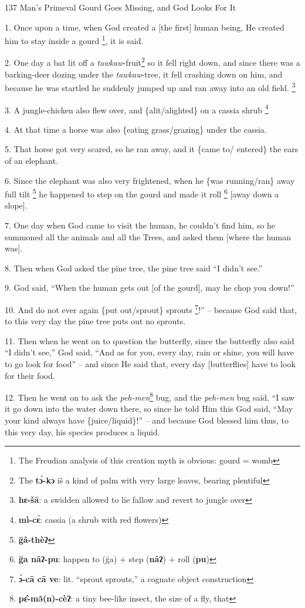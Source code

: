 
137 Man's Primeval Gourd Goes Missing, and God Looks For It

1. Once upon a time, when God created a [the first] human being, He created him
to stay inside a gourd \footnote{The Freudian analysis of this creation myth is obvious: gourd = womb}, it is said.

2. One day a bat lit off a \textit{tawkaw}-fruit\footnote{The \textbf{tɔ́-kɔ} iš a kind of palm with very large leaves, bearing plentiful} so it fell right down, and
since there was a barking-deer dozing under the \textit{tawkaw}-tree, it fell crashing
down on him, and because he was startled he suddenly jumped up and ran away into
an old field. \footnote{\textbf{hɛ-šā}: a swidden allowed to lie fallow and revert to jungle over}

3. A jungle-chicken also flew over, and \{alit/alighted\} on a cassia shrub \footnote{\textbf{mì-cɛ̀}: cassia (a shrub with red flowers)}

4. At that time a horse was also \{eating grass/grazing\} under the cassia.

5. That horse got very scared, so he ran away, and it \{came to/ entered\} the
ears of an elephant.

6. Since the elephant was also very frightened, when he \{was running/ran\} away
full tilt \footnote{\textbf{g̈â-thèʔ}} he happened to step on the gourd and made it roll \footnote{\textbf{g̈a nâʔ-pu}: happen to (g̈a) + step (\textbf{nâʔ}) + roll (\textbf{pu})} [away down
a slope].

7. One day when God came to visit the human, he couldn't find him, so he summoned
all the animals and all the Trees, and asked them [where the human was].

8. Then when God asked the pine tree, the pine tree said ``I didn't see.''

9. God said, ``When the human gets out [of the gourd], may he chop you down!''

10. And do not ever again \{put out/sprout\} sprouts \footnote{\textbf{ɔ̀-cā cā ve}: lit. ``sprout sprouts,'' a cognate object construction}!'' -- because God said
that, to this very day the pine tree puts out no sprouts.

11. Then when he went on to question the butterfly, since the butterfly also said
``I didn't see,'' God said, ``And as for you, every day, rain or shine, you will
have to go look for food'' -- and since He said that, every day [butterflies] have
to look for their food.

12. Then he went on to ask the \textit{peh-men}\footnote{\textbf{pɛ̂-mə̂(n)-cèʔ}: a tiny bee-like insect, the size of a fly, that} bug, and the \textit{peh-men}
bug said, ``I saw it go down into the water down there, so since he told Him this
God said, ``May your kind always have \{juice/liquid\}!'' -- and because God blessed
him thus, to this very day, his species produces a liquid.

